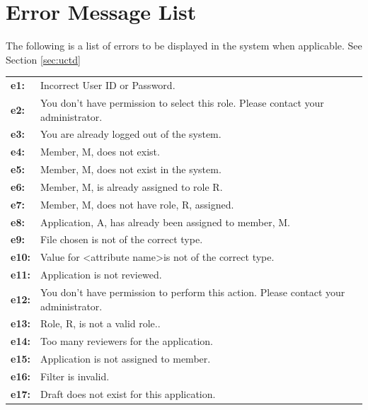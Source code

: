 \documentclass[fontsize=12pt,paper=letter,twoside]{scrartcl}
\begin{document}
\section{Error Message List} \label{app:error}

The following is a list of errors to be displayed in the system when applicable. See Section \ref{sec:uctd}
\begin{table}[htb]


\begin{tabular}{ll}
\textbf{e1:} & Incorrect User ID or Password.                                                    \\
\textbf{e2:} & You don't have permission to select this role. Please contact your administrator. \\
\textbf{e3:} & You are already logged out of the system.                                         \\
\textbf{e4:} & Member, M, does not exist.                                          \\
\textbf{e5:} & Member, M, does not exist in the system.                                          \\
\textbf{e6:} & Member, M, is already assigned to role R.                                         \\
\textbf{e7:} & Member, M, does not have role, R, assigned.                                       \\
\textbf{e8:} & Application, A, has already been assigned to member, M.                           \\
\textbf{e9:} & File chosen is not of the correct type.                                           \\
\textbf{e10:} & Value for \textless attribute name\textgreater is not of the correct type. \\
\textbf{e11:} & Application is not reviewed.                                           \\
\textbf{e12:} & You don't have permission to perform this action. Please contact your administrator.                                          \\
\textbf{e13:} & Role, R, is not a valid role..                                          \\
\textbf{e14:} & Too many reviewers for the application.                                         \\
\textbf{e15:} & Application is not assigned to member.                                         \\
\textbf{e16:} & Filter is invalid.                                         \\
\textbf{e17:} & Draft does not exist for this application.                                         \\
\end{tabular}
\label{errorList}
\end{table}
\end{document}
